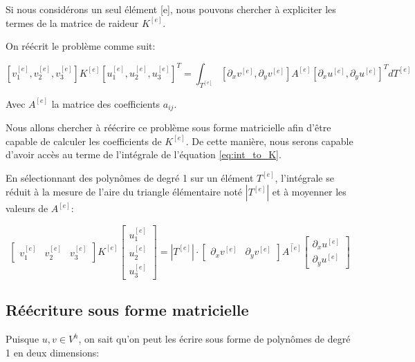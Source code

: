 \documentclass{article}
\begin{document}
Si nous considérons un seul élément [e], nous pouvons chercher à expliciter
les termes de la matrice de raideur $K^{[e]}$.

On réécrit le problème comme suit:

\begin{equation}
    \left[ v_1^{[e]}, v_2^{[e]},  v_3^{[e]} \right] K^{[e]}
     \left[ u_1^{[e]}, u_2^{[e]}, u_3^{[e]} \right]^T
     = \int_{T^{[e]}} \left[\partial_x v^{[e]},
     \partial_y v^{[e]}\right] A^{[e]} \left[\partial_x u^{[e]},
     \partial_y u^{[e]}\right]^T dT^{[e]}
\end{equation}

Avec $A^{[e]}$ la matrice des coefficients $a_{ij}$.

Nous allons chercher à réécrire ce problème sous forme matricielle
afin d'être capable de calculer les coefficients de $K^{[e]}$.
De cette manière, nous serons capable d'avoir accès au terme
de l'intégrale de l'équation \ref{eq:int_to_K}.

En sélectionnant des polynômes de degré 1 sur un élément $T^{[e]}$,
l'intégrale se réduit à la mesure de l'aire du triangle élémentaire
noté $|T^{[e]}|$ et à moyenner les valeurs de $A^{[e]}$:

\begin{equation}
    \begin{bmatrix}
        v_1^{[e]} & v_2^{[e]} &  v_3^{[e]}
    \end{bmatrix}
    K^{[e]}
    \begin{bmatrix}
        u_1^{[e]} \\ u_2^{[e]} \\ u_3^{[e]}
    \end{bmatrix}
     = |T^{[e]}| \cdot
    \begin{bmatrix}
        \partial_x v^{[e]} & \partial_y v^{[e]}
    \end{bmatrix}
    \overline{A^{[e]}}
    \begin{bmatrix}
        \partial_x u^{[e]} \\ \partial_y u^{[e]}
    \end{bmatrix}
    \label{eq:vKu_eq}
\end{equation}

\subsection{Réécriture sous forme matricielle}

Puisque $u,v \in V^h$, on sait qu'on peut les écrire sous forme
de polynômes de degré 1 en deux dimensions:
\end{document}
